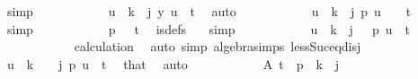 \begin{isabellebody}
\ simp\isanewline
\ \ \ \ \ \ \ \ \isamarkupfalse%
\ \isamarkupfalse%
\ {\isachardoublequoteopen}{\isasymforall}u\ {\isacharless}{\kern0pt}\ k\ {\isacharminus}{\kern0pt}\ j{\isachardot}{\kern0pt}\ y\ u\ {\isasymnoteq}\ t{\isachardoublequoteclose}\ \isamarkupfalse%
\ auto\isanewline
\ \ \ \ \ \ \ \ \isamarkupfalse%
\ \isamarkupfalse%
\ {\isachardoublequoteopen}{\isasymforall}u\ {\isacharless}{\kern0pt}\ k\ {\isacharminus}{\kern0pt}\ j{\isachardot}{\kern0pt}\ p\ {\isacharparenleft}{\kern0pt}u\ {\isacharplus}{\kern0pt}\ {}{\isacharparenright}{\kern0pt}\ {\isasymnoteq}\ t{\isachardoublequoteclose}\ \isamarkupfalse%
\ {\isacharasterisk}{\kern0pt}{\isacharasterisk}{\kern0pt}\ \isamarkupfalse%
\ simp\isanewline
\ \ \ \ \ \ \ \ \isamarkupfalse%
\ \isamarkupfalse%
\ {\isachardoublequoteopen}p\ {}\ {\isasymnoteq}\ t{\isachardoublequoteclose}\ \isamarkupfalse%
\ is{\isacharunderscore}{\kern0pt}defs\ {\isacharasterisk}{\kern0pt}{\isacharasterisk}{\kern0pt}\ \isamarkupfalse%
\ simp\isanewline
\ \ \ \ \ \ \ \ \isamarkupfalse%
\ \isamarkupfalse%
\ {\isachardoublequoteopen}{\isasymforall}u\ {\isacharless}{\kern0pt}\ k\ {\isacharminus}{\kern0pt}\ j\ {\isacharplus}{\kern0pt}\ {}{\isachardot}{\kern0pt}\ p\ u\ {\isasymnoteq}\ t{\isachardoublequoteclose}\ \isanewline
\ \ \ \ \ \ \ \ \ \ \isamarkupfalse%
\ calculation\ \isamarkupfalse%
\ {\isacharparenleft}{\kern0pt}auto\ simp{\isacharcolon}{\kern0pt}\ algebra{\isacharunderscore}{\kern0pt}simps\ less{\isacharunderscore}{\kern0pt}Suc{\isacharunderscore}{\kern0pt}eq{\isacharunderscore}{\kern0pt}{}{\isacharunderscore}{\kern0pt}disj{\isacharparenright}{\kern0pt}\isanewline
\ \ \ \ \ \ \ \ \isamarkupfalse%
\ \isamarkupfalse%
\ {\isachardoublequoteopen}{\isasymforall}u\ {\isacharless}{\kern0pt}\ {\isacharparenleft}{\kern0pt}k\ {\isacharplus}{\kern0pt}\ {}{\isacharparenright}{\kern0pt}\ {\isacharminus}{\kern0pt}\ j{\isachardot}{\kern0pt}\ p\ u\ {\isasymnoteq}\ t{\isachardoublequoteclose}\ \isamarkupfalse%
\ that\ \isamarkupfalse%
\ auto\isanewline
\ \ \ \ \ \ \ \ \isamarkupfalse%
\ \isamarkupfalse%
\ A{}{\isacharcolon}{\kern0pt}\ {\isachardoublequoteopen}t\ {\isasymnotin}\ p\ {\isacharbackquote}{\kern0pt}\ {\isacharbraceleft}{\kern0pt}{\isachardot}{\kern0pt}{\isachardot}{\kern0pt}{\isacharless}{\kern0pt}{\isacharparenleft}{\kern0pt}{\isacharparenleft}{\kern0pt}k{\isacharplus}{\kern0pt}{}{\isacharparenright}{\kern0pt}\ {\isacharminus}{\kern0pt}\ j{\isacharparenright}{\kern0pt}{\isacharbraceright}{\kern0pt}{\isachardoublequoteclose}\ \isamarkupfalse%

\end{isabellebody}
